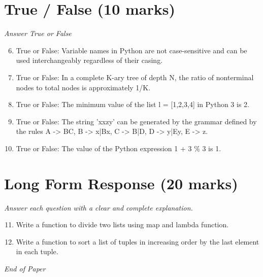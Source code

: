 \documentclass[12pt]{article}
\begin{document}
\section*{True / False (10 marks)}
\textit{Answer True or False}
\begin{enumerate}[label=\arabic*.]
\setcounter{enumi}{5}
\item True or False: Variable names in Python are not case-sensitive and can be used interchangeably regardless of their casing.
\item True or False: In a complete K-ary tree of depth N, the ratio of nonterminal nodes to total nodes is approximately 1/K.
\item True or False: The minimum value of the list l = [1,2,3,4] in Python 3 is 2.
\item True or False: The string 'xxzy' can be generated by the grammar defined by the rules A -\textgreater{} BC, B -\textgreater{} x|Bx, C -\textgreater{} B|D, D -\textgreater{} y|Ey, E -\textgreater{} z.
\item True or False: The value of the Python expression 1 + 3 \% 3 is 1.
\end{enumerate}

\section*{Long Form Response (20 marks)}
\textit{Answer each question with a clear and complete explanation.}
\begin{enumerate}[label=\arabic*.]
\setcounter{enumi}{10}
\item Write a function to divide two lists using map and lambda function.
\item Write a function to sort a list of tuples in increasing order by the last element in each tuple.
\end{enumerate}

\vfill
\noindent\textit{End of Paper}
\end{document}
